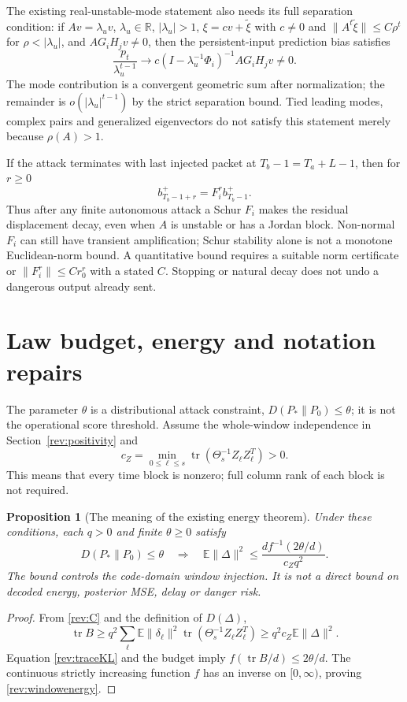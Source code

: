 \documentclass[11pt,a4paper]{article}
\newtheorem{proposition}{Proposition}
\DeclareMathOperator{\tr}{tr}
\newcommand{\E}{\mathbb E}
\newcommand{\R}{\mathbb R}
\begin{document}
The existing real-unstable-mode statement also needs its full separation
condition: if $Av=\lambda_u v$, $\lambda_u\in\R$, $|\lambda_u|>1$,
$\xi=cv+\widetilde\xi$ with $c\ne0$ and
$\|A^t\widetilde\xi\|\le C\rho^t$ for $\rho<|\lambda_u|$, and
$AG_iH_jv\ne0$, then the persistent-input prediction bias satisfies
\[
 \frac{p_t}{\lambda_u^{t-1}}
 \longrightarrow c(I-\lambda_u^{-1}\Phi_i)^{-1}AG_iH_jv\ne0.
\]
The mode contribution is a convergent geometric sum after normalization;
the remainder is $o(|\lambda_u|^{t-1})$ by the strict separation bound.
Tied leading modes, complex pairs and generalized eigenvectors do not
satisfy this statement merely because $\rho(A)>1$.

If the attack terminates with last injected packet at $T_b-1=T_a+L-1$,
then for $r\ge0$
\begin{equation}
 b_{T_b-1+r}^+=F_i^r b_{T_b-1}^+.\label{rev:stop}
\end{equation}
Thus after any finite autonomous attack a Schur $F_i$ makes the residual
displacement decay, even when $A$ is unstable or has a Jordan block.
Non-normal $F_i$ can still have transient amplification; Schur stability
alone is not a monotone Euclidean-norm bound. A quantitative bound requires
a suitable norm certificate or $\|F_i^r\|\le Cr_0^r$ with a stated $C$.
Stopping or natural decay does not undo a dangerous output already sent.

\section{Law budget, energy and notation repairs}
\label{rev:budget}
The parameter $\theta$ is a distributional attack constraint,
$D(P_*\|P_0)\le\theta$; it is not the operational score threshold.
Assume the whole-window independence in Section~\ref{rev:positivity} and
\begin{equation}
 c_Z=\min_{0\le\ell\le s}
        \tr(\Theta_s^{-1}Z_\ell Z_\ell^T)>0.\label{rev:cZ}
\end{equation}
This means that every time block is nonzero; full column rank of each
block is not required.

\begin{proposition}[The meaning of the existing energy theorem]
\label{rev:energybound}
Under these conditions, each $q>0$ and finite $\theta\ge0$ satisfy
\begin{equation}
 D(P_*\|P_0)\le\theta
 \quad\Longrightarrow\quad
 \E\|\Delta\|^2\le
 \frac{d f^{-1}(2\theta/d)}{c_Zq^2}.
 \label{rev:windowenergy}
\end{equation}
The bound controls the code-domain window injection. It is not a direct
bound on decoded energy, posterior MSE, delay or danger risk.
\end{proposition}
\begin{proof}
From \eqref{rev:C} and the definition of $D(\Delta)$,
\[
 \tr B\ge q^2\sum_\ell\E\|\delta_\ell\|^2
                \tr(\Theta_s^{-1}Z_\ell Z_\ell^T)
 \ge q^2c_Z\E\|\Delta\|^2.
\]
Equation \eqref{rev:traceKL} and the budget imply
$f(\tr B/d)\le2\theta/d$. The continuous strictly increasing function
$f$ has an inverse on $[0,\infty)$, proving \eqref{rev:windowenergy}.
\end{proof}
\end{document}
